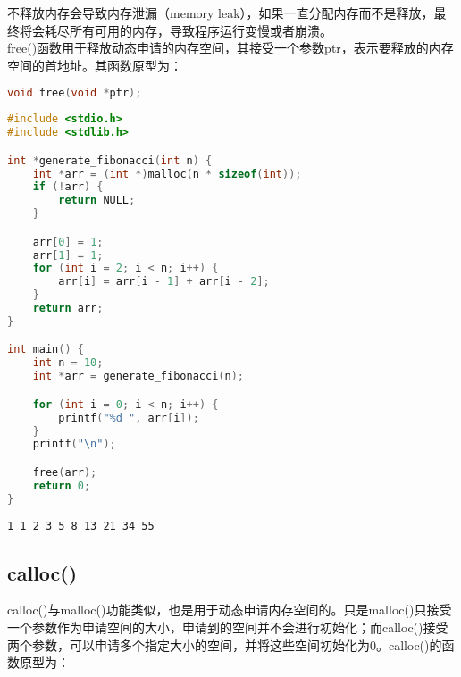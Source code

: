 不释放内存会导致内存泄漏（memory leak），如果一直分配内存而不是释放，最终将会耗尽所有可用的内存，导致程序运行变慢或者崩溃。\\

free()函数用于释放动态申请的内存空间，其接受一个参数ptr，表示要释放的内存空间的首地址。其函数原型为：

\vspace{-0.5cm}

\begin{lstlisting}[language=C]
void free(void *ptr);
\end{lstlisting}

\vspace{0.5cm}


\begin{lstlisting}[language=C]
#include <stdio.h>
#include <stdlib.h>

int *generate_fibonacci(int n) {
    int *arr = (int *)malloc(n * sizeof(int));
    if (!arr) {
        return NULL;
    }

    arr[0] = 1;
    arr[1] = 1;
    for (int i = 2; i < n; i++) {
        arr[i] = arr[i - 1] + arr[i - 2];
    }
    return arr;
}

int main() {
    int n = 10;
    int *arr = generate_fibonacci(n);

    for (int i = 0; i < n; i++) {
        printf("%d ", arr[i]);
    }
    printf("\n");

    free(arr);
    return 0;
}
\end{lstlisting}

\begin{tcolorbox}
    \begin{verbatim}
1 1 2 3 5 8 13 21 34 55
	\end{verbatim}
\end{tcolorbox}

\vspace{0.5cm}

\subsection{calloc()}

calloc()与malloc()功能类似，也是用于动态申请内存空间的。只是malloc()只接受一个参数作为申请空间的大小，申请到的空间并不会进行初始化；而calloc()接受两个参数，可以申请多个指定大小的空间，并将这些空间初始化为0。calloc()的函数原型为：

\vspace{-0.5cm}

